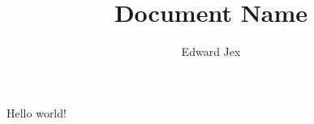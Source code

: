 \documentclass[a4paper,12pt]{article}
\begin{document}
\title{Document Name}	
\author{Edward Jex}
\maketitle

Hello world!
\end{document}

